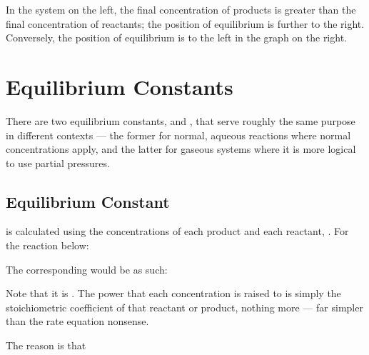 			In the system on the left, the final concentration of products is greater than the final concentration of reactants;
			 the position of equilibrium is further to the right. Conversely, the position of equilibrium is to the left
			in the graph on the right.





	\pagebreak
	\section{Equilibrium Constants}

		There are two equilibrium constants, \Kc{} and \Kp{}, that serve roughly the same purpose in different contexts --- the former for normal,
		aqueous reactions where normal concentrations apply, and the latter for gaseous systems where it is more logical to use partial pressures.

		\subsection{Equilibrium Constant \texorpdfstring{\MKc{}}{Kc}}

			\Kc{} is calculated using the concentrations of each product and each reactant, . For the reaction below:


			The corresponding \Kc{} would be as such:

			\txtdiagram{
				\[K_{c} = \frac{[C]^{c}[D]^{d}}{[A]^{a}[B]^{b}}\]
			}{}

			Note that it is . The power that each concentration is raised to is simply the stoichiometric
			coefficient of that reactant or product, nothing more --- far simpler than the rate equation nonsense.

			The reason is that



